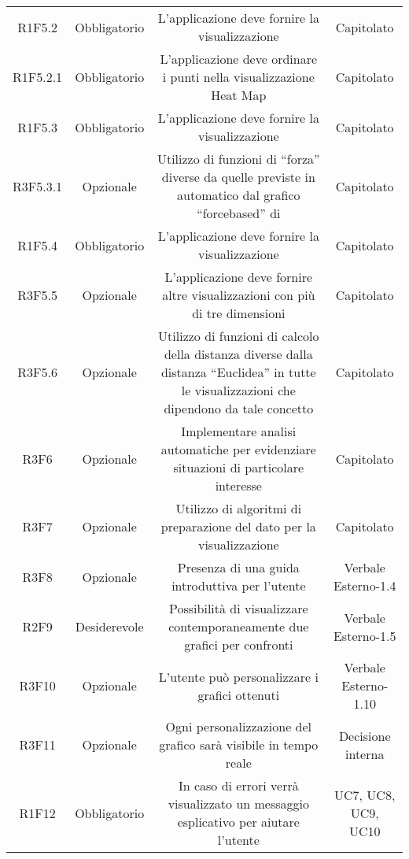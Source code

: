 \begin{center}
\begin{longtable}{C{\colA} C{\colB} C{\colC} C{\colA}}
R1F5.2 & Obbligatorio & L'applicazione deve fornire la visualizzazione  & Capitolato\\
R1F5.2.1 & Obbligatorio & L'applicazione deve ordinare i punti nella visualizzazione Heat Map & Capitolato \\
R1F5.3 & Obbligatorio & L'applicazione deve fornire la visualizzazione  & Capitolato\\
R3F5.3.1 & Opzionale & Utilizzo di funzioni di “forza” diverse da quelle previste in automatico dal grafico “forcebased” di  & Capitolato\\
R1F5.4 & Obbligatorio & L'applicazione deve fornire la visualizzazione  & Capitolato \\
R3F5.5 & Opzionale & L'applicazione deve fornire altre visualizzazioni con più di tre dimensioni & Capitolato\\
R3F5.6 & Opzionale & Utilizzo di funzioni di calcolo della distanza diverse dalla distanza “Euclidea” in tutte le visualizzazioni che dipendono da tale concetto & Capitolato \\
R3F6 & Opzionale & Implementare analisi automatiche per evidenziare situazioni di particolare interesse & Capitolato\\
R3F7 & Opzionale & Utilizzo di algoritmi di preparazione del dato per la visualizzazione & Capitolato\\
R3F8 & Opzionale & Presenza di una guida introduttiva per l'utente & Verbale Esterno-1.4\\
R2F9 & Desiderevole & Possibilità di visualizzare contemporaneamente due grafici per confronti & Verbale Esterno-1.5\\
R3F10 & Opzionale & L'utente può personalizzare i grafici ottenuti & Verbale Esterno-1.10 \\
R3F11 & Opzionale & Ogni personalizzazione del grafico sarà visibile in tempo reale & Decisione interna \\
R1F12 & Obbligatorio & In caso di errori verrà visualizzato un messaggio esplicativo per aiutare l'utente & UC7, UC8, UC9, UC10\\

\end{longtable}
\end{center}



